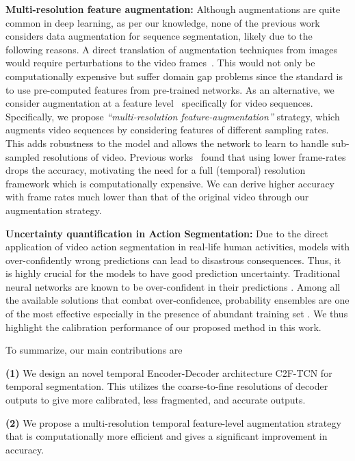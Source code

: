 \documentclass[10pt,twocolumn,letterpaper]{article}
\newcommand{\modelname}{C2F-TCN}
\begin{document}
\textbf{Multi-resolution feature augmentation:} Although augmentations are quite common in deep learning, as per our knowledge, none of the previous work considers data augmentation for sequence segmentation, likely due to the following reasons. A direct translation of augmentation techniques from images would require perturbations to the video frames~\cite{videoaug-han2019video, videoaug-wang2016temporal}. This would not only be computationally expensive but suffer domain gap problems since the standard is to use pre-computed features from pre-trained networks.
As an alternative, we consider augmentation at a feature level~\cite{featureaug-dong2019feature} specifically for video sequences. 
Specifically, we propose \textit{``multi-resolution feature-augmentation''} strategy, which augments video sequences by considering features of different sampling rates.  This adds robustness to the model and allows the network to learn to handle sub-sampled resolutions of video. Previous works~\cite{farha2019ms} found that using lower frame-rates drops the accuracy,  motivating the need for a full (temporal) resolution framework which is computationally expensive. We can derive higher accuracy with frame rates much lower than that of the original video through our augmentation strategy.

\textbf{Uncertainty quantification in Action Segmentation:} Due to the direct application of video action segmentation in real-life human activities, models with over-confidently wrong predictions can lead to disastrous consequences. Thus, it is highly crucial for the models to have good prediction uncertainty. Traditional neural networks are known to be over-confident in their predictions \cite{Guo_calibration_2017}. Among all the available solutions that combat over-confidence, probability ensembles are one of the most effective \cite{DeepEnsemble, lee2015m} especially in the presence of abundant training set \cite{rahaman2020uncertainty}. We thus highlight the calibration performance of our proposed method in this work.

To summarize, our main contributions are 

    \textbf{(1)} We design an novel temporal Encoder-Decoder architecture \modelname{} for temporal segmentation. This utilizes the coarse-to-fine resolutions of decoder outputs to give more calibrated, less fragmented, and accurate outputs.
    
    \textbf{(2)} We propose a multi-resolution temporal feature-level augmentation strategy that is computationally more efficient and gives a significant improvement in accuracy.
    
\end{document}
